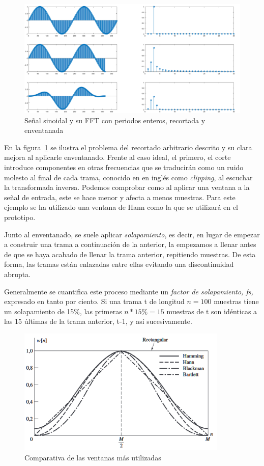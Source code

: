 \begin{figure}[!ht]
\begin{center}
\includegraphics[width=14cm]{img/problem_fft.png}
\caption{\label{fig:probfft}Señal sinoidal y su FFT con periodos enteros, recortada y enventanada}
\end{center}
\end{figure}

En la figura~\ref{fig:probfft} se ilustra el problema del recortado arbitrario descrito y su clara mejora al aplicarle enventanado. Frente al caso ideal, el primero, el corte introduce componentes en otras frecuencias que se traducirán como un ruido molesto al final de cada trama, conocido en en inglés como \emph{clipping}, al escuchar la transformada inversa. Podemos comprobar como al aplicar una ventana a la señal de entrada, este se hace menor y afecta a menos muestras. Para este ejemplo se ha utilizado una ventana de Hann como la que se utilizará en el prototipo.

Junto al enventanado, se suele aplicar \emph{solapamiento}, es decir, en lugar de empezar a construir una trama a continuación de la anterior, la empezamos a llenar antes de que se haya acabado de llenar la trama anterior, repitiendo muestras. De esta forma, las tramas están enlazadas entre ellas evitando una discontinuidad abrupta.

Generalmente se cuantifica este proceso mediante un \emph{factor de solapamiento, fs,} expresado en tanto por ciento. Si una trama t de longitud $n = 100$ muestras tiene un solapamiento de 15\%, las primeras $n*15\% = 15$ muestras de t son idénticas a las 15 últimas de la trama anterior, t-1, y así sucesivamente.

\begin{figure}[!b]
\begin{center}
\includegraphics[width=10cm]{img/ventanas_grafica.png}
\caption{\label{fig:compven}Comparativa de las ventanas más utilizadas}
\end{center}
\end{figure}

